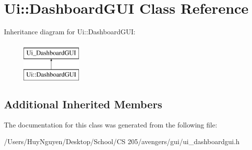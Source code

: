\hypertarget{classUi_1_1DashboardGUI}{}\section{Ui\+:\+:Dashboard\+G\+UI Class Reference}
\label{classUi_1_1DashboardGUI}
Inheritance diagram for Ui\+:\+:Dashboard\+G\+UI\+:\begin{figure}[H]
\begin{center}
\leavevmode
\includegraphics[height=2.000000cm]{classUi_1_1DashboardGUI}
\end{center}
\end{figure}
\subsection*{Additional Inherited Members}


The documentation for this class was generated from the following file\+:\begin{DoxyCompactItemize}
\item 
/\+Users/\+Huy\+Nguyen/\+Desktop/\+School/\+C\+S 205/avengers/gui/ui\+\_\+dashboardgui.\+h\end{DoxyCompactItemize}
